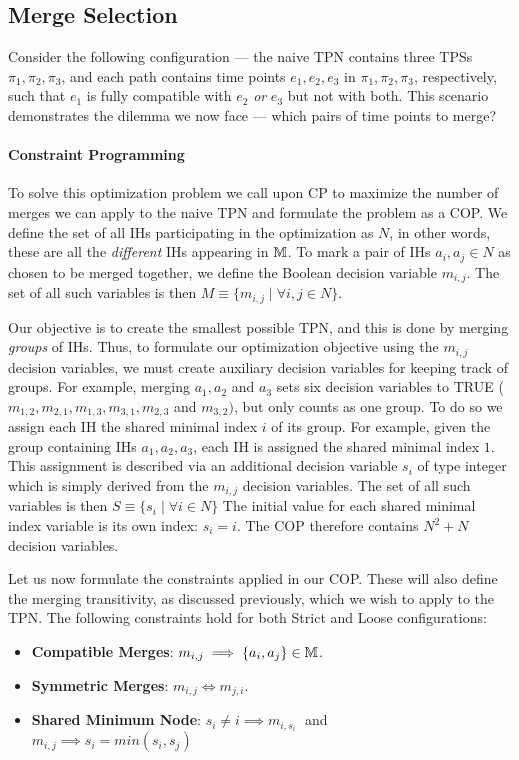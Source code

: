 \subsection{Merge Selection}
\label{generating: merge selection}
Consider the following configuration --- the naive TPN contains three TPSs $\pi_1,\pi_2,\pi_3$, and each path contains time points $e_1, e_2, e_3$ in $\pi_1, \pi_2, \pi_3$, respectively, such that $e_1$ is fully compatible with $e_2$ {\em or} $e_3$ but not with both.
This scenario demonstrates the dilemma we now face --- which pairs of time points to merge? 


\paragraph{Constraint Programming} To solve this optimization problem we call upon CP to maximize the number of merges we can apply to the naive TPN and formulate the problem as a COP.
We define the set of all IHs participating in the optimization as $N$, in other words, these are all the {\em different} IHs appearing in $\mathbb{M}$.
To mark a pair of IHs $a_i,a_j \in N$ as chosen to be merged together, we define the Boolean decision variable $m_{i,j}$. The set of all such variables is then $M \equiv \{m_{i,j} \mid \forall i,j \in N\}$.

Our objective is to create the smallest possible TPN, and this is done by merging {\em groups} of IHs. Thus, to formulate our optimization objective using the $m_{i,j}$ decision variables, we must create auxiliary decision variables for keeping track of groups. For example, merging $a_1, a_2$ and $a_3$ sets six decision variables to TRUE ($m_{1,2}, m_{2,1}, m_{1,3}, m_{3,1}, m_{2,3}$ and $m_{3,2})$, but only counts as one group.
To do so we assign each IH the shared minimal index $i$ of its group.
For example, given the group containing IHs $a_1,a_2,a_3$, each IH is assigned the shared minimal index $1$.
This assignment is described via an additional decision variable $s_i$ of type integer which is simply derived from the $m_{i,j}$ decision variables. The set of all such variables is then $S \equiv \{s_i \mid \forall i \in N\}$
The initial value for each shared minimal index variable is its own index: $s_i = i$.
The COP therefore contains $N^2 + N$ decision variables.

Let us now formulate the constraints applied in our COP.
These will also define the merging transitivity, as discussed previously, which we wish to apply to the TPN. 
The following constraints hold for both Strict and Loose configurations:
\begin{itemize}
    \item\textbf{Compatible Merges}:  $m_{i, j} \implies \{a_i, a_j\} \in \mathbb{M}$.
    \item \textbf{Symmetric Merges}:  $m_{i, j} \iff m_{j, i}$.
    \item \textbf{Shared Minimum Node}:  $s_i \neq i \implies m_{i, s_i} \;$ and\\
    $m_{i, j} \implies s_i = min(s_i, s_j)$
\end{itemize}

